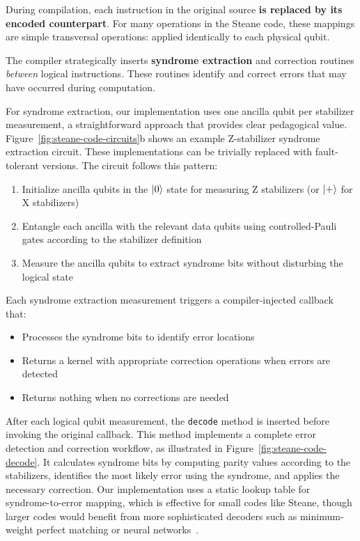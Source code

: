 During compilation, each instruction in the original source \textbf{is replaced by its encoded counterpart}. For many operations in the Steane code, these mappings are simple transversal operations: applied identically to each physical qubit.

The compiler strategically inserts \textbf{syndrome extraction} and correction routines \textit{between} logical instructions. These routines identify and correct errors that may have occurred during computation.

For syndrome extraction, our implementation uses one ancilla qubit per stabilizer measurement, a straightforward approach that provides clear pedagogical value. Figure~\ref{fig:steane-code-circuits}b shows an example Z-stabilizer syndrome extraction circuit. These implementations can be trivially replaced with fault-tolerant versions. The circuit follows this pattern:

\begin{enumerate}
\item Initialize ancilla qubits in the $|0\rangle$ state for measuring Z stabilizers (or $|+\rangle$ for X stabilizers)
\item Entangle each ancilla with the relevant data qubits using controlled-Pauli gates according to the stabilizer definition
\item Measure the ancilla qubits to extract syndrome bits without disturbing the logical state
\end{enumerate}

Each syndrome extraction measurement triggers a compiler-injected callback that:
\begin{itemize}
\item Processes the syndrome bits to identify error locations
\item Returns a kernel with appropriate correction operations when errors are detected
\item Returns nothing when no corrections are needed
\end{itemize}

After each logical qubit measurement, the \texttt{decode} method is inserted before invoking the original callback. This method implements a complete error detection and correction workflow, as illustrated in Figure~\ref{fig:steane-code-decode}. It calculates syndrome bits by computing parity values according to the stabilizers, identifies the most likely error using the syndrome, and applies the necessary correction. Our implementation uses a static lookup table for syndrome-to-error mapping, which is effective for small codes like Steane, though larger codes would benefit from more sophisticated decoders such as minimum-weight perfect matching or neural networks~\cite{higgott2022pymatching, yao2024belief}.

